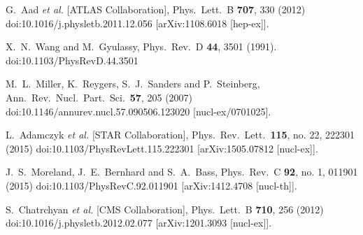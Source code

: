 \documentclass[aps,prc,twocolumn,superscriptaddress,showpacs,floatfix,nofootinbib]{revtex4-1}
\begin{document}
\begin{thebibliography}{99}
  G.~Aad {\it et al.} [ATLAS Collaboration],
  Phys.\ Lett.\ B {\bf 707}, 330 (2012)
  doi:10.1016/j.physletb.2011.12.056
  [arXiv:1108.6018 [hep-ex]].


  X.~N.~Wang and M.~Gyulassy,
  Phys.\ Rev.\ D {\bf 44}, 3501 (1991).
  doi:10.1103/PhysRevD.44.3501


  M.~L.~Miller, K.~Reygers, S.~J.~Sanders and P.~Steinberg,
  Ann.\ Rev.\ Nucl.\ Part.\ Sci.\  {\bf 57}, 205 (2007)
  doi:10.1146/annurev.nucl.57.090506.123020
  [nucl-ex/0701025].


  L.~Adamczyk {\it et al.} [STAR Collaboration],
  Phys.\ Rev.\ Lett.\  {\bf 115}, no. 22, 222301 (2015)
  doi:10.1103/PhysRevLett.115.222301
  [arXiv:1505.07812 [nucl-ex]].


  J.~S.~Moreland, J.~E.~Bernhard and S.~A.~Bass,
  Phys.\ Rev.\ C {\bf 92}, no. 1, 011901 (2015)
  doi:10.1103/PhysRevC.92.011901
  [arXiv:1412.4708 [nucl-th]].


  S.~Chatrchyan {\it et al.} [CMS Collaboration],
  Phys.\ Lett.\ B {\bf 710}, 256 (2012)
  doi:10.1016/j.physletb.2012.02.077
  [arXiv:1201.3093 [nucl-ex]].



\end{thebibliography}
\end{document}
